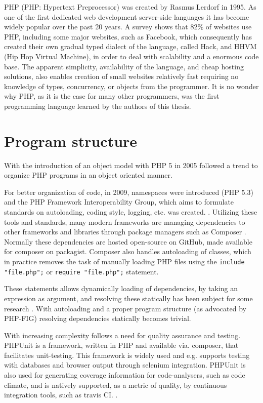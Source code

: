 PHP (PHP: Hypertext Preprocessor) was created by Rasmus Lerdorf in 1995. As one of the first dedicated web development server-side languages it has become widely popular over the past 20 years. A survey shows that 82\% of websites use PHP, including some major websites, such as Facebook, which consequently has created their own gradual typed dialect of the language, called Hack, and HHVM (Hip Hop Virtual Machine), in order to deal with scalability and a enormous code base. The apparent simplicity, availability of the language, and cheap hosting solutions,  also enables creation of small websites relatively fast requiring no knowledge of types, concurrency, or objects from the programmer. It is no wonder why PHP, as it is the case for many other programmers, was the first programming language learned by the authors of this thesis.

\section{Program structure}
With the introduction of an object model with PHP 5 in 2005 followed a trend to organize PHP programs in an object oriented manner. 

For better organization of code, in 2009, namespaces were introduced (PHP 5.3) and the PHP Framework Interoperability Group, which aims to formulate standards on autoloading, coding style, logging, etc. was created. . Utilizing these tools and standards, many modern frameworks are managing dependencies to other frameworks and libraries through package managers such as Composer . Normally these dependencies are hosted open-source on GitHub, made available for composer on packagist. Composer also handles autoloading of classes, which in practice removes the task of manually loading PHP files using the \texttt{include "file.php";} or \texttt{require "file.php";} statement. 

These statements allows dynamically loading of dependencies, by taking an expression as argument, and resolving these statically has been subject for some research . With autoloading and a proper program structure (as advocated by PHP-FIG) resolving dependencies statically becomes trivial.

With increasing complexity follows a need for quality assurance and testing. PHPUnit is a framework, written in PHP and available via. composer, that facilitates unit-testing. This framework is widely used and e.g. supports testing with databases and browser output through selenium integration. PHPUnit is also used for generating coverage information for code-analysers, such as code climate, and is natively supported, as a metric of quality, by continuous integration tools, such as travis CI. . 

